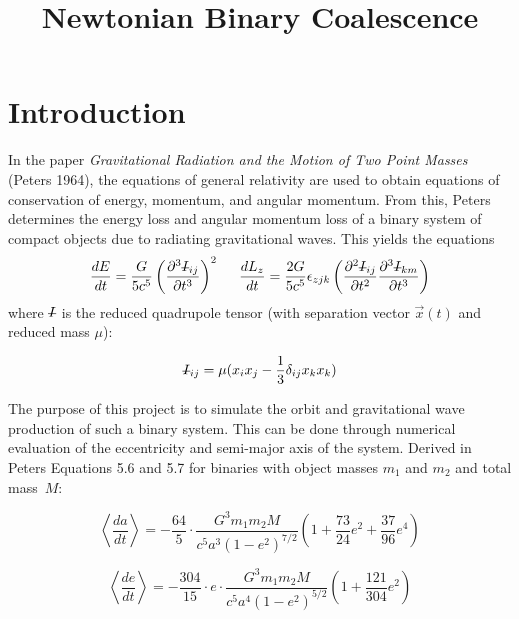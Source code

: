 \documentclass[preprint2]{aastex}
\newcommand{\Ibar}{\mbox{\st{$I$}}}
\begin{document}
\title{Newtonian Binary Coalescence}

\author{\vspace{-0.5cm}{\sc John Pharo}\vspace{0.2cm}{\sc Cutter Coryell}
\vspace{0.2cm} \vspace{1cm}}



\section{Introduction}

In the paper \textit{Gravitational Radiation and the Motion of Two Point Masses} (Peters 1964), the equations of general relativity are used to obtain equations of conservation of energy, momentum, and angular momentum. From this, Peters determines the energy loss and angular momentum loss of a binary system of compact objects due to radiating gravitational waves. This yields the equations
\[ \frac{dE}{dt} = \frac{G}{5c^5} \left( \frac{\partial^3 \Ibar_{ij}}{\partial t^3} \right)^2 \hspace*{0.5cm} \frac{dL_z}{dt} = \frac{2G}{5c^5} \epsilon_{zjk} \left( \frac{\partial^2 \Ibar_{ij}}{\partial t^2} \frac{\partial^3 \Ibar_{km}}{\partial t^3} \right) \]
where \(\Ibar\) is the reduced quadrupole tensor (with separation vector \(\vec{x} (t)\) and reduced mass $\mu$):

\begin{equation} \label{quad}
\Ibar_{ij}  =\mu (x_i x_j - \frac{1}{3} \delta_{ij} x_k x_k)
\end{equation}

The purpose of this project is to simulate the orbit and gravitational wave production of such a binary system. This can be done through numerical evaluation of the eccentricity and semi-major axis of the system. Derived in Peters Equations 5.6 and 5.7 for binaries with object masses \(m_1\) and \(m_2\) and total mass~\(M\):

\begin{equation} \label{axis}
\left< \frac{da}{dt} \right> = - \frac{64}{5} \cdot \frac{G^3 m_1 m_2 M}{c^5 a^3 (1 - e^2)^{7/2}} \left( 1 + \frac{73}{24} e^2 + \frac{37}{96} e^4 \right)
\end{equation}

\begin{equation} \label{ecc}
\left< \frac{de}{dt} \right> = - \frac{304}{15} \cdot e \cdot \frac{G^3 m_1 m_2 M}{c^5 a^4 (1 - e^2)^{5/2}} \left( 1 + \frac{121}{304}e^2 \right)
\end{equation}
\end{document}
